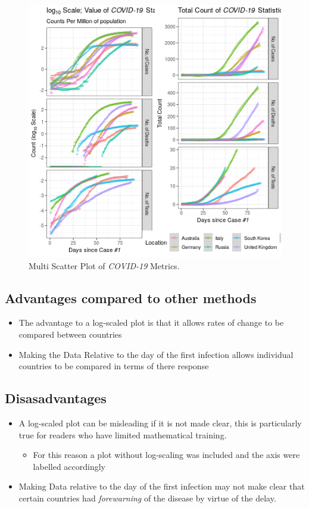 \documentclass[11pt]{article}
\begin{document}
\begin{figure}[htbp]
\centering
\includegraphics[width=18cm]{fgrid.png}
\caption{\label{fig:org542b788}Multi Scatter Plot of \emph{COVID-19} Metrics.}
\end{figure}

\subsection{Advantages compared to other methods}
\label{sec:orgb1bf3c2}
\begin{itemize}
\item The advantage to a log-scaled plot is that it allows rates of change to be
compared between countries
\item Making the Data Relative to the day of the first infection allows individual
countries to be compared in terms of there response
\end{itemize}
\subsection{Disasadvantages}
\label{sec:org29ecbad}
\begin{itemize}
\item A log-scaled plot can be misleading if it is not made clear, this is particularly
true for readers who have limited mathematical training.
\begin{itemize}
\item For this reason a plot without log-scaling was included and the axis were
labelled accordingly
\end{itemize}
\item Making Data relative to the day of the first infection may not make clear that
certain countries had \emph{forewarning} of the disease by virtue of the delay.
\end{itemize}
\end{document}
